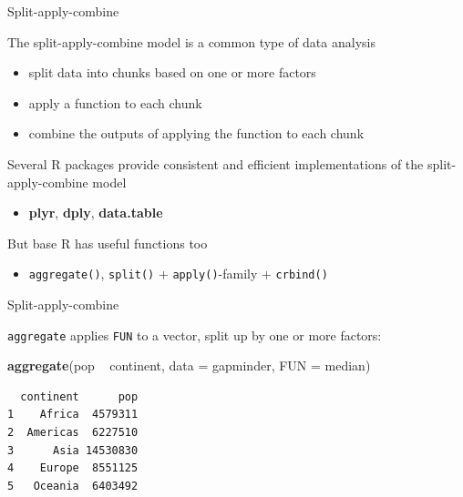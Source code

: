 \documentclass[10pt,ignorenonframetext,compress, aspectratio=169]{beamer}
\newenvironment{Shaded}{\begin{snugshade}}{\end{snugshade}}
\newcommand{\KeywordTok}[1]{\textcolor[rgb]{0.13,0.29,0.53}{\textbf{{#1}}}}
\newcommand{\DataTypeTok}[1]{\textcolor[rgb]{0.13,0.29,0.53}{{#1}}}
\newcommand{\StringTok}[1]{\textcolor[rgb]{0.31,0.60,0.02}{{#1}}}
\newcommand{\NormalTok}[1]{{#1}}
\begin{document}
\begin{frame}{Split-apply-combine}

The \alert{split-apply-combine} model is a common type of data analysis

\begin{itemize}
\itemsep1pt\parskip0pt
\item
  \alert{split} data into chunks based on one or more factors
\item
  \alert{apply} a function to each chunk
\item
  \alert{combine} the outputs of applying the function to each chunk
\end{itemize}

Several R packages provide consistent and efficient implementations of
the split-apply-combine model

\begin{itemize}
\itemsep1pt\parskip0pt
\item
  \textbf{plyr}, \textbf{dply}, \textbf{data.table}
\end{itemize}

But base R has useful functions too

\begin{itemize}
\itemsep1pt\parskip0pt
\item
  \texttt{aggregate()}, \texttt{split()} + \texttt{apply()}-family +
  \texttt{c\textbar{}rbind()}
\end{itemize}

\end{frame}

\begin{frame}[fragile]{Split-apply-combine}

\texttt{aggregate} applies \texttt{FUN} to a vector, split up by one or
more factors:

\scriptsize

\begin{Shaded}
\begin{Highlighting}[]
\KeywordTok{aggregate}\NormalTok{(pop ~}\StringTok{ }\NormalTok{continent, }\DataTypeTok{data =} \NormalTok{gapminder, }\DataTypeTok{FUN =} \NormalTok{median)}
\end{Highlighting}
\end{Shaded}

\begin{verbatim}
  continent      pop
1    Africa  4579311
2  Americas  6227510
3      Asia 14530830
4    Europe  8551125
5   Oceania  6403492
\end{verbatim}

\normalsize

\end{frame}
\end{document}
